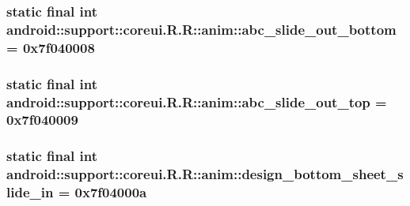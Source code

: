 \hypertarget{classandroid_1_1support_1_1coreui_1_1_r_1_1anim_f95d537684b0b63fdfea8b6cb3c512d3}{
\subsubsection[{abc\_\-slide\_\-out\_\-bottom}]{\setlength{\rightskip}{0pt plus 5cm}static final int android::support::coreui.R.R::anim::abc\_\-slide\_\-out\_\-bottom = 0x7f040008}}
\label{classandroid_1_1support_1_1coreui_1_1_r_1_1anim_f95d537684b0b63fdfea8b6cb3c512d3}


\hypertarget{classandroid_1_1support_1_1coreui_1_1_r_1_1anim_f11ceaeb990b0c108c7caa43d23a0aff}{
\subsubsection[{abc\_\-slide\_\-out\_\-top}]{\setlength{\rightskip}{0pt plus 5cm}static final int android::support::coreui.R.R::anim::abc\_\-slide\_\-out\_\-top = 0x7f040009}}
\label{classandroid_1_1support_1_1coreui_1_1_r_1_1anim_f11ceaeb990b0c108c7caa43d23a0aff}


\hypertarget{classandroid_1_1support_1_1coreui_1_1_r_1_1anim_fed297596452f1dde9b33b120141953a}{
\subsubsection[{design\_\-bottom\_\-sheet\_\-slide\_\-in}]{\setlength{\rightskip}{0pt plus 5cm}static final int android::support::coreui.R.R::anim::design\_\-bottom\_\-sheet\_\-slide\_\-in = 0x7f04000a}}
\label{classandroid_1_1support_1_1coreui_1_1_r_1_1anim_fed297596452f1dde9b33b120141953a}


